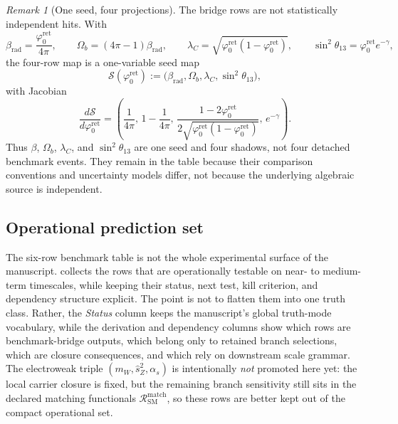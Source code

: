 \documentclass[11pt,a4paper]{article}
\theoremstyle{definition}
\theoremstyle{remark}
\newtheorem*{remark}{Remark}
\newcommand{\phiz}{\varphi_0^{\mathrm{ret}}}
\newcommand{\SM}{\mathrm{SM}}
\begin{document}
\begin{remark}[One seed, four projections]
The bridge rows are not statistically independent hits. With
\[
\beta_{\mathrm{rad}}=\frac{\phiz}{4\pi},
\qquad
\Omega_b=(4\pi-1)\beta_{\mathrm{rad}},
\qquad
\lambda_C=\sqrt{\phiz(1-\phiz)},
\qquad
\sin^2\theta_{13}=\phiz e^{-\gamma},
\]
the four-row map is a one-variable seed map
\[
\mathcal S(\phiz):=\bigl(\beta_{\mathrm{rad}},\Omega_b,\lambda_C,\sin^2\theta_{13}\bigr),
\]
with Jacobian
\[
\frac{d\mathcal S}{d\phiz}
=
\left(
\frac{1}{4\pi},
\,
1-\frac{1}{4\pi},
\,
\frac{1-2\phiz}{2\sqrt{\phiz(1-\phiz)}},
\,
e^{-\gamma}
\right).
\]
Thus $\beta$, $\Omega_b$, $\lambda_C$, and $\sin^2\theta_{13}$ are one seed and four shadows, not four detached benchmark events. They remain in the table because their comparison conventions and uncertainty models differ, not because the underlying algebraic source is independent.
\end{remark}

\subsection{Operational prediction set}

The six-row benchmark table is not the whole experimental surface of the manuscript.  collects the rows that are operationally testable on near- to medium-term timescales, while keeping their status, next test, kill criterion, and dependency structure explicit. The point is not to flatten them into one truth class. Rather, the \emph{Status} column keeps the manuscript's global truth-mode vocabulary, while the derivation and dependency columns show which rows are benchmark-bridge outputs, which belong only to retained branch selections, which are closure consequences, and which rely on downstream scale grammar. The electroweak triple $(m_W,\hat s_Z^2,\alpha_s)$ is intentionally \emph{not} promoted here yet: the local carrier closure is fixed, but the remaining branch sensitivity still sits in the declared matching functionals $\mathcal R_{\SM}^{\mathrm{match}}$, so these rows are better kept out of the compact operational set.
\end{document}
